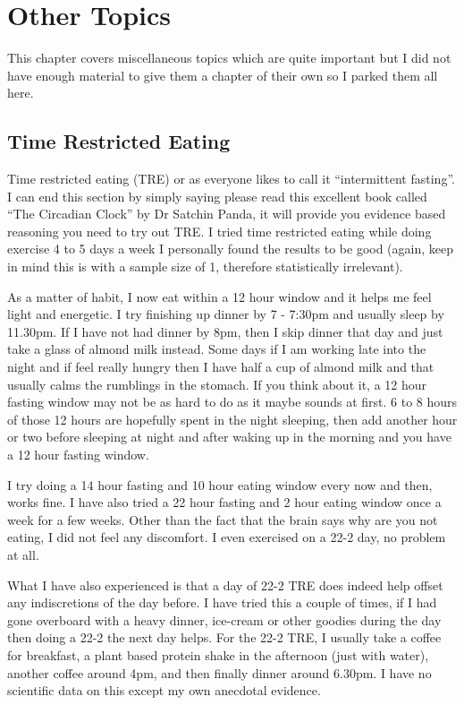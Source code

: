 \documentclass[
  oneside]{book}
\begin{document}
\hypertarget{other-topics}{%
\chapter{Other Topics}\label{other-topics}}

This chapter covers miscellaneous topics which are quite important but I did not have enough material to give them a chapter of their own so I parked them all here.

\hypertarget{time-restricted-eating}{%
\section{Time Restricted Eating}\label{time-restricted-eating}}

Time restricted eating (TRE) or as everyone likes to call it ``intermittent fasting''. I can end this section by simply saying please read this excellent book called ``The Circadian Clock'' by Dr Satchin Panda, it will provide you evidence based reasoning you need to try out TRE. I tried time restricted eating while doing exercise 4 to 5 days a week I personally found the results to be good (again, keep in mind this is with a sample size of 1, therefore statistically irrelevant).

As a matter of habit, I now eat within a 12 hour window and it helps me feel light and energetic. I try finishing up dinner by 7 - 7:30pm and usually sleep by 11.30pm. If I have not had dinner by 8pm, then I skip dinner that day and just take a glass of almond milk instead. Some days if I am working late into the night and if feel really hungry then I have half a cup of almond milk and that usually calms the rumblings in the stomach. If you think about it, a 12 hour fasting window may not be as hard to do as it maybe sounds at first. 6 to 8 hours of those 12 hours are hopefully spent in the night sleeping, then add another hour or two before sleeping at night and after waking up in the morning and you have a 12 hour fasting window.

I try doing a 14 hour fasting and 10 hour eating window every now and then, works fine. I have also tried a 22 hour fasting and 2 hour eating window once a week for a few weeks. Other than the fact that the brain says why are you not eating, I did not feel any discomfort. I even exercised on a 22-2 day, no problem at all.

What I have also experienced is that a day of 22-2 TRE does indeed help offset any indiscretions of the day before. I have tried this a couple of times, if I had gone overboard with a heavy dinner, ice-cream or other goodies during the day then doing a 22-2 the next day helps. For the 22-2 TRE, I usually take a coffee for breakfast, a plant based protein shake in the afternoon (just with water), another coffee around 4pm, and then finally dinner around 6.30pm. I have no scientific data on this except my own anecdotal evidence.
\end{document}
